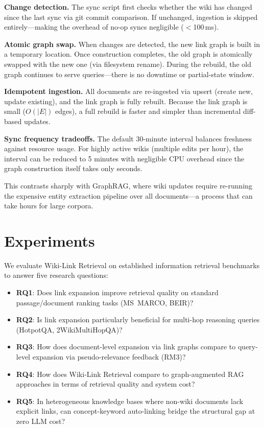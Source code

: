 \documentclass[sigconf,review]{acmart}
\newcommand{\sys}{Wiki-Link Retrieval\xspace}
\begin{document}
\textbf{Change detection.}  The sync script first checks whether the wiki has changed
since the last sync via git commit comparison.  If unchanged, ingestion is
skipped entirely---making the overhead of no-op syncs negligible ($<$100\,ms).

\textbf{Atomic graph swap.}  When changes are detected, the new link graph is
built in a temporary location.  Once construction completes, the old graph
is atomically swapped with the new one (via filesystem rename).  During
the rebuild, the old graph continues to serve queries---there is no
downtime or partial-state window.

\textbf{Idempotent ingestion.}  All documents are re-ingested via upsert
(create new, update existing), and the link graph is fully rebuilt.
Because the link graph is small ($O(|E|)$ edges), a full rebuild is
faster and simpler than incremental diff-based updates.

\textbf{Sync frequency tradeoffs.}  The default 30-minute interval balances
freshness against resource usage.  For highly active wikis (multiple edits
per hour), the interval can be reduced to 5 minutes with negligible CPU
overhead since the graph construction itself takes only seconds.

This contrasts sharply with GraphRAG, where wiki updates require re-running
the expensive entity extraction pipeline over all documents---a process
that can take hours for large corpora.


\section{Experiments}
\label{sec:experiments}

We evaluate \sys on established information retrieval benchmarks to answer
five research questions:

\begin{itemize}
  \item \textbf{RQ1}: Does link expansion improve retrieval quality on standard passage/document ranking tasks (MS~MARCO, BEIR)?
  \item \textbf{RQ2}: Is link expansion particularly beneficial for multi-hop reasoning queries (HotpotQA, 2WikiMultiHopQA)?
  \item \textbf{RQ3}: How does document-level expansion via link graphs compare to query-level expansion via pseudo-relevance feedback (RM3)?
  \item \textbf{RQ4}: How does \sys compare to graph-augmented RAG approaches in terms of retrieval quality and system cost?
  \item \textbf{RQ5}: In heterogeneous knowledge bases where non-wiki documents lack explicit links, can concept-keyword auto-linking bridge the structural gap at zero LLM cost?
\end{itemize}
\end{document}
